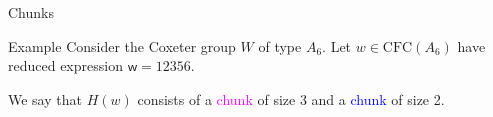 \documentclass[9pt]{beamer}
\newcommand{\w}{{\textsf{w}}}
\newcommand{\CFC}{\mathrm{CFC}}
\newcommand\xxaxis{0}
\newcommand\yyaxis{90}
\newcommand\sqbl[2]{
    \fill[draw=darkblue, fill=darkblue!05, line width=1.1pt, rounded corners, shift={(\xxaxis:#1)}, shift={(\yyaxis:#2)}]
    (0,0) -- (1,0) -- (1,-1) -- (0,-1) -- cycle; }
\newcommand\sqm[2]{
    \fill[draw=magenta, fill=magenta!08, line width=1.1pt, rounded corners, shift={(\xxaxis:#1)}, shift={(\yyaxis:#2)}]
    (0,0) -- (1,0) -- (1,-1) -- (0,-1) -- cycle; }
\begin{document}
\begin{frame}{Chunks}
\begin{block}{Example} Consider the Coxeter group $W$ of type $A_6$. Let $w \in \CFC(A_6)$ have reduced expression $\w = 12356$.
\begin{center} %
\end{center}
    \pause
    We say that $H(w)$ consists of a \textcolor{magenta}{chunk} of size 3 and a \textcolor{blue}{chunk} of size 2.
\end{block}
\end{frame}
\end{document}
